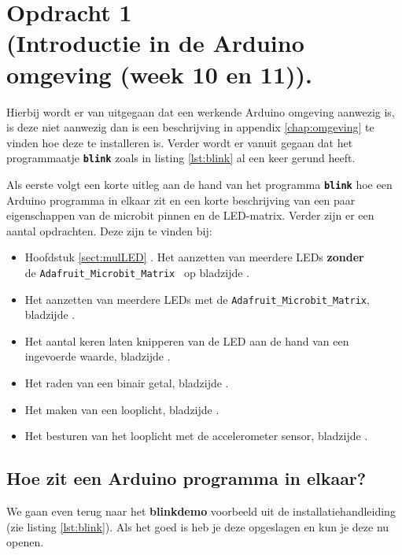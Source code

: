 \chapter{Opdracht 1\\  \small (Introductie in de Arduino omgeving (week 10 en 11)).}
\label{chap:intr}

Hierbij wordt er van uitgegaan dat een werkende Arduino omgeving aanwezig is, is deze niet aanwezig dan is een beschrijving in appendix \ref{chap:omgeving} te vinden hoe deze te installeren is. Verder wordt er vanuit gegaan dat het programmaatje \texttt{\textbf{blink}} zoals in listing \ref{lst:blink} al een keer gerund heeft.


Als eerste volgt een korte uitleg aan de hand van het programma \texttt{\textbf{blink}} hoe een Arduino programma in elkaar zit en een korte beschrijving van een paar eigenschappen van de microbit pinnen en de LED-matrix. Verder zijn er een aantal opdrachten. Deze zijn te vinden bij:

\begin{itemize}
	\item Hoofdstuk \ref{sect:mulLED} . Het aanzetten van meerdere LEDs\textbf{ zonder}\\ de \texttt{Adafruit\_Microbit\_Matrix } op bladzijde \pageref{sect:mulLED}.
	\item Het aanzetten van meerdere LEDs met de \texttt{Adafruit\_Microbit\_Matrix}, bladzijde \pageref{blz:opdrmLEDSmatrix}.
	\item Het aantal keren laten knipperen van de LED aan de hand van een ingevoerde waarde, bladzijde \pageref{blad:aantalknipper}. 
	\item Het raden van een binair getal, bladzijde \pageref{blz:bineairGetal}.
	\item Het maken van een looplicht, bladzijde  \pageref{opdr:loppl}.
	\item Het besturen van het looplicht met de accelerometer sensor, bladzijde \pageref{opdr:accSens}.
\end{itemize} 


\section{ Hoe zit een Arduino programma in elkaar?}\label{sec:blink}

We gaan even terug naar het \textbf{blinkdemo} voorbeeld uit de installatiehandleiding (zie listing \ref{lst:blink}).  Als het goed is heb je deze opgeslagen en kun je deze nu openen.

